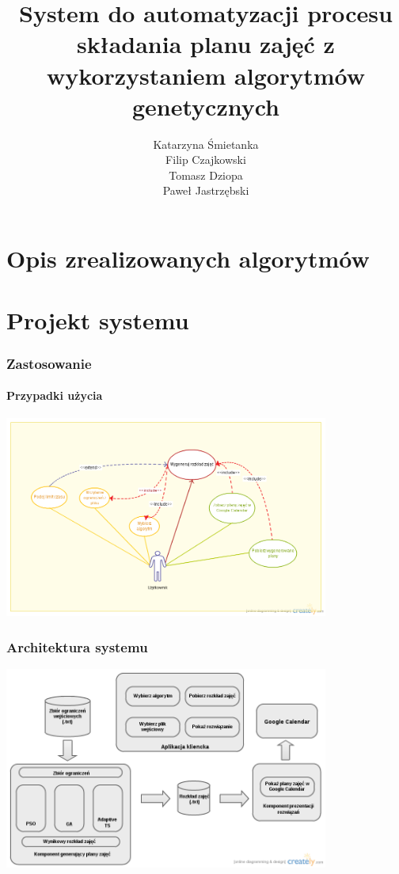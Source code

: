 \documentclass[11pt]{report}
\title{System do automatyzacji procesu składania planu zajęć z wykorzystaniem algorytmów genetycznych}
\author{
	Katarzyna Śmietanka \\
	Filip Czajkowski \\
	Tomasz Dziopa\\
	Paweł Jastrzębski
}
\begin{document}
%
%

\maketitle
\tableofcontents









\chapter{Opis zrealizowanych algorytmów}


%

\chapter{Projekt systemu}
\subsection{Zastosowanie}
\subsubsection{Przypadki użycia}
\par
\includegraphics[width=0.8\textwidth]{InzynierkaUseCase.png}
\subsection{Architektura systemu}

\par
\includegraphics[width=0.8\textwidth]{ComponentsDiagram.png}
\end{document}
